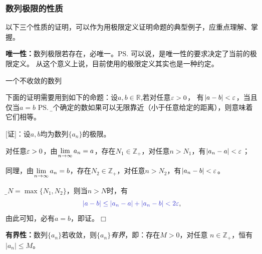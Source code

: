 \subsubsection{数列极限的性质}

以下三个性质的证明，可以作为用极限定义证明命题的典型例子，应重点理解、掌握。

{\bf 唯一性：}数列极限若存在，必唯一。\ps{可以说，是唯一性的要求决定了当前的极限定义。
从这个意义上说，目前使用的极限定义其实也是一种约定。}

\begin{center}
	
	一个不收敛的数列
\end{center}

下面的证明需要用到如下的命题：设$a,b\in\mathbb{R}$,若对任意$\varepsilon>0$，
有$|a-b|<\varepsilon$，当且仅当$a=b$
\ps{\b 两个确定的数如果可以无限靠近（小于任意给定的距离），则意味着它们相等。}

[证]：设$a,b$均为数列$\{a_n\}$的极限。

对任意$\varepsilon>0$，由$\lim\limits_{n\to\infty} a_n=a$，存在$N_1\in\mathbb{Z}_+$，对任意$n>N_1$，有$|a_n-a|<\varepsilon$；

同理，由$\lim\limits_{n\to\infty} a_n=b$，存在$N_2\in\mathbb{Z}_+$，对任意$n>N_2$，有$|a_n-b|<\varepsilon$。

令{\b $N=\max\{N_1,N_2\}$}，则当$n>N$时，有
$${\b |a-b|\leq|a_n-a|+|a_n-b|<2\e},$$
由此可知，必有$a=b$，即证。\hfill $\Box$

{\bf 有界性：}数列$\{a_n\}$若收敛，则{\it $\{a_n\}$有界}，即：存在$M>0$，对任意
$n\in\mathbb{Z}_+$，恒有$|a_n|\leq M$。


